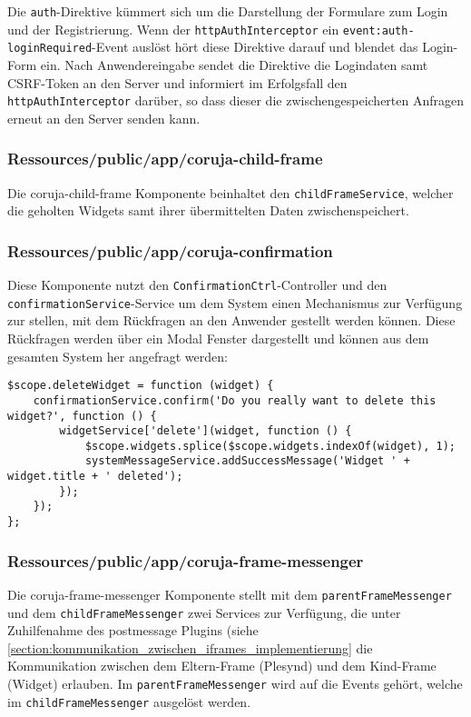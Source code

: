 Die \texttt{auth}-Direktive kümmert sich um die Darstellung der Formulare zum Login und der Registrierung. Wenn der \texttt{httpAuthInterceptor} ein \texttt{event:auth-loginRequired}-Event auslöst hört diese Direktive darauf und blendet das Login-Form ein. Nach Anwendereingabe sendet die Direktive die Logindaten samt CSRF-Token an den Server und informiert im Erfolgsfall den \texttt{httpAuthInterceptor} darüber, so dass dieser die zwischengespeicherten Anfragen erneut an den Server senden kann.

\subsubsection{Ressources/public/app/coruja-child-frame}
Die coruja-child-frame Komponente beinhaltet den \texttt{childFrameService}, welcher die geholten Widgets samt ihrer übermittelten Daten zwischenspeichert.

\subsubsection{Ressources/public/app/coruja-confirmation}
Diese Komponente nutzt den \texttt{ConfirmationCtrl}-Controller und den \texttt{confirmationService}-Service um dem System einen Mechanismus zur Verfügung zur stellen, mit dem Rückfragen an den Anwender gestellt werden können. Diese Rückfragen werden über ein Modal Fenster dargestellt und können aus dem gesamten System her angefragt werden:
\begin{lstlisting}[caption=Rückfrage an den Anwender bei Löschen eines Widgets, label=listing:confirmation_and_message]
$scope.deleteWidget = function (widget) {
    confirmationService.confirm('Do you really want to delete this widget?', function () {
        widgetService['delete'](widget, function () {
            $scope.widgets.splice($scope.widgets.indexOf(widget), 1);
            systemMessageService.addSuccessMessage('Widget ' + widget.title + ' deleted');
        });
    });
};
\end{lstlisting}

\subsubsection{Ressources/public/app/coruja-frame-messenger}
Die coruja-frame-messenger Komponente stellt mit dem \texttt{parentFrameMessenger} und dem \texttt{childFrameMessenger} zwei Services zur Verfügung, die unter Zuhilfenahme des postmessage Plugins (siehe \ref{section:kommunikation_zwischen_iframes_implementierung} die Kommunikation zwischen dem Eltern-Frame (Plesynd) und dem Kind-Frame (Widget) erlauben. Im \texttt{parentFrameMessenger} wird auf die Events gehört, welche im \texttt{childFrameMessenger} ausgelöst werden.

